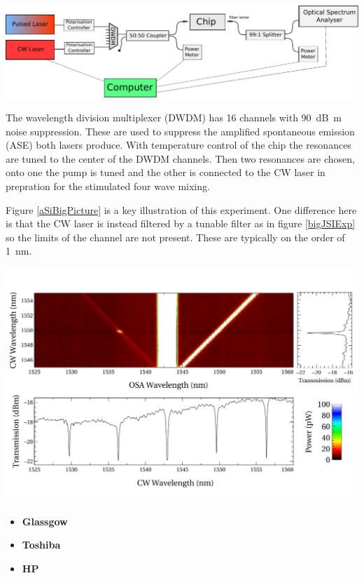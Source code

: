 \begingroup
    \centering  
    \includegraphics[width=18cm]{img/method/setup_1.pdf}
     \vspace{3pt} \label{simpleJSI}
\endgroup

The wavelength division multiplexer (DWDM) has 16 channels with \SI{90}{\deci\bel\m} noise suppression. These are used to suppress the amplified spontaneous emission (ASE) both lasers produce. With temperature control of the chip the resonances are tuned to the center of the DWDM channels. Then two resonances are chosen, onto one the pump is tuned and the other is connected to the CW laser in prepration for the stimulated four wave mixing. 

Figure \ref{aSiBigPicture} is a key illustration of this experiment. One difference here is that the CW laser is instead filtered by a tunable filter as in figure \ref{bigJSIExp} so the limits of the channel are not present. These are typically on the order of \SI{1}{\nano\m}.

\begingroup
    \centering  
    \includegraphics[width=18cm]{img/method/aSiBigPicture.pdf}
     \vspace{3pt} \label{aSiBigPicture}
\endgroup



\begin{itemize}
	\item {\bf Glassgow }
	\item {\bf Toshiba }
	\item {\bf HP }
\end{itemize}

